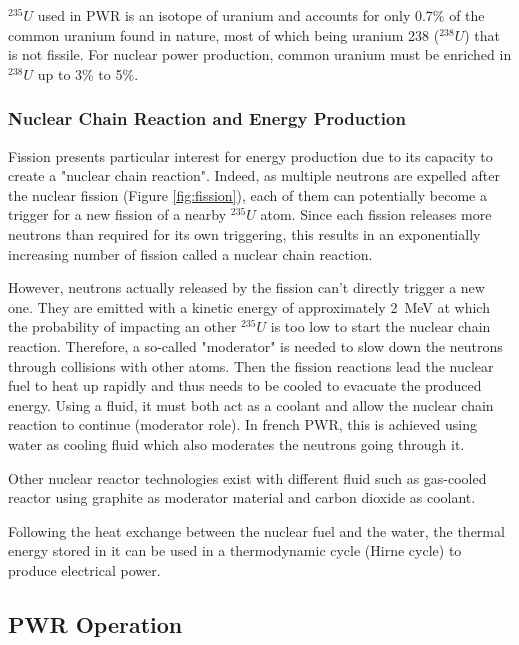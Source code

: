 \npar

$^{235}U$ used in PWR is an isotope of uranium and accounts for only 0.7\% of the common uranium found in nature, most of which being uranium 238 ($^{238}U$) that is not fissile. For nuclear power production, common uranium must be enriched in $^{238}U$ up to 3\% to 5\%.

\subsubsection{Nuclear Chain Reaction and Energy Production}


Fission presents particular interest for energy production due to its capacity to create a "nuclear chain reaction". Indeed, as multiple neutrons are expelled after the nuclear fission (Figure \ref{fig:fission}), each of them can potentially become a trigger for a new fission of a nearby $^{235}U$ atom. Since each fission releases more neutrons than required for its own triggering, this results in an exponentially increasing number of fission called a nuclear chain reaction.

\npar

However, neutrons actually released by the fission can't directly trigger a new one. They are emitted with a kinetic energy of approximately 2~MeV at which the probability of impacting an other $^{235}U$ is too low to start the nuclear chain reaction. Therefore, a so-called "moderator" is needed to slow down the neutrons through collisions with other atoms. Then the fission reactions lead the nuclear fuel to heat up rapidly and thus needs to be cooled to evacuate the produced energy. Using a fluid, it must both act as a coolant and allow the nuclear chain reaction to continue (moderator role). In french PWR, this is achieved using water as cooling fluid which also moderates the neutrons going through it.

\begin{remark*}{}
Other nuclear reactor technologies exist with different fluid such as gas-cooled reactor using graphite as moderator material and carbon dioxide as coolant.
\end{remark*}

\npar

Following the heat exchange between the nuclear fuel and the water, the thermal energy stored in it can be used in a thermodynamic cycle (\eg Hirne cycle) to produce electrical power.



\subsection{PWR Operation}

